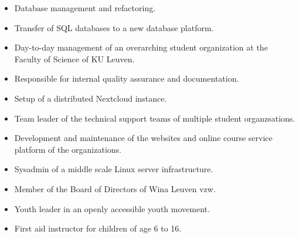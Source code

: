 \documentclass[10pt,a4paper,ragged2e]{altacv}
\begin{document}
\divider

\begin{itemize}
	\item Database management and refactoring.
	\item Transfer of SQL databases to a new database platform.
\end{itemize}

\divider





\begin{itemize}
	\item Day-to-day management of an overarching student organization at the Faculty of Science of KU Leuven.
	\item Responsible for internal quality assurance and documentation.
	\item Setup of a distributed Nextcloud instance.
\end{itemize}

\divider


\begin{itemize}
	\item Team leader of the technical support teams of multiple student organzsations.
	\item Development and maintenance of the websites and online course service platform of the organizations.
	\item Sysadmin of a middle scale Linux server infrastructure.
	\item Member of the Board of Directors of Wina Leuven vzw.
\end{itemize}

\divider

\begin{itemize}
	\item Youth leader in an openly accessible youth movement.
	\item First aid instructor for children of age 6 to 16.
\end{itemize}
\end{document}
